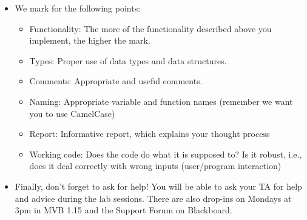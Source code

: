 \documentclass[11pt]{report}
\begin{document}
\begin{itemize}
	\item We mark for the following points:
	\begin{itemize}
	    \item Functionality: The more of the functionality described above you implement, the higher the mark.
	    \item Types: Proper use of data types and data structures. 
	    \item Comments: Appropriate and useful comments. 
	    \item Naming: Appropriate variable and function names (remember we want you to use CamelCase)
	    \item Report: Informative report, which explains your thought process 
	    \item Working code: Does the code do what it is supposed to? Is it robust, i.e., does it deal correctly with wrong inputs (user/program interaction)
	\end{itemize}
	
	\item Finally, don't forget to ask for help! You will be able to ask your TA for help and advice during the lab sessions. There are also drop-ins on Mondays at 3pm in MVB 1.15 and the Support Forum on Blackboard.
\end{itemize}
\end{document}
